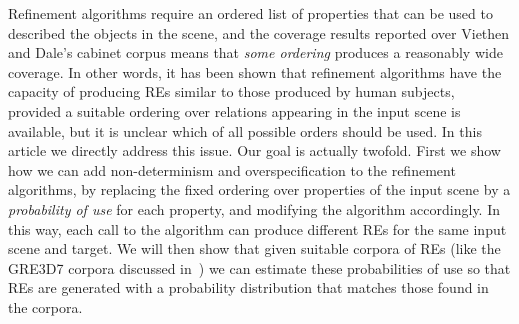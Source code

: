 Refinement algorithms require an 
ordered list of properties that can be used to described the objects in the scene, and the coverage results reported over Viethen and 
Dale's cabinet corpus means that \emph{some ordering} produces a reasonably wide coverage.  In other words, it has been shown that refinement algorithms have the capacity of producing REs similar to those produced by human subjects, provided a suitable ordering over relations appearing 
in the input scene is available, but it is unclear which of all possible orders should be used.  In this article we directly address this issue.  
Our goal is actually twofold. First we show how we can add non-determinism and overspecification to the refinement algorithms, by replacing the fixed ordering 
over properties of the input scene by a \emph{probability of use} for each property, and modifying the algorithm accordingly.  
In this way, each call to the algorithm can produce different REs for the same input scene and target.  We will then show that given suitable corpora of REs (like the GRE3D7 corpora discussed in~\cite{viet:gene11}) we can estimate these probabilities of use so that REs are generated with a probability distribution that matches those found in the corpora.  




